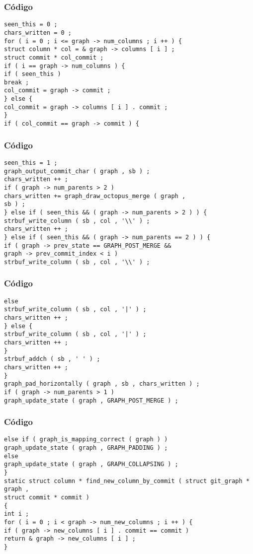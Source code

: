 \documentclass{beamer}
\begin{document}
\begin{frame}[fragile]
\frametitle{C\'odigo}
\begin{verbatim}
seen_this = 0 ; 
chars_written = 0 ; 
for ( i = 0 ; i <= graph -> num_columns ; i ++ ) { 
struct column * col = & graph -> columns [ i ] ; 
struct commit * col_commit ; 
if ( i == graph -> num_columns ) { 
if ( seen_this ) 
break ; 
col_commit = graph -> commit ; 
} else { 
col_commit = graph -> columns [ i ] . commit ; 
} 
if ( col_commit == graph -> commit ) { 
\end{verbatim}
\end{frame}
\begin{frame}[fragile]
\frametitle{C\'odigo}
\begin{verbatim}
seen_this = 1 ; 
graph_output_commit_char ( graph , sb ) ; 
chars_written ++ ; 
if ( graph -> num_parents > 2 ) 
chars_written += graph_draw_octopus_merge ( graph , 
sb ) ; 
} else if ( seen_this && ( graph -> num_parents > 2 ) ) { 
strbuf_write_column ( sb , col , '\\' ) ; 
chars_written ++ ; 
} else if ( seen_this && ( graph -> num_parents == 2 ) ) { 
if ( graph -> prev_state == GRAPH_POST_MERGE && 
graph -> prev_commit_index < i ) 
strbuf_write_column ( sb , col , '\\' ) ; 
\end{verbatim}
\end{frame}
\begin{frame}[fragile]
\frametitle{C\'odigo}
\begin{verbatim}
else 
strbuf_write_column ( sb , col , '|' ) ; 
chars_written ++ ; 
} else { 
strbuf_write_column ( sb , col , '|' ) ; 
chars_written ++ ; 
} 
strbuf_addch ( sb , ' ' ) ; 
chars_written ++ ; 
} 
graph_pad_horizontally ( graph , sb , chars_written ) ; 
if ( graph -> num_parents > 1 ) 
graph_update_state ( graph , GRAPH_POST_MERGE ) ; 
\end{verbatim}
\end{frame}
\begin{frame}[fragile]
\frametitle{C\'odigo}
\begin{verbatim}
else if ( graph_is_mapping_correct ( graph ) ) 
graph_update_state ( graph , GRAPH_PADDING ) ; 
else 
graph_update_state ( graph , GRAPH_COLLAPSING ) ; 
} 
static struct column * find_new_column_by_commit ( struct git_graph * graph , 
struct commit * commit ) 
{ 
int i ; 
for ( i = 0 ; i < graph -> num_new_columns ; i ++ ) { 
if ( graph -> new_columns [ i ] . commit == commit ) 
return & graph -> new_columns [ i ] ; 
} 
\end{verbatim}
\end{frame}
\end{document}
